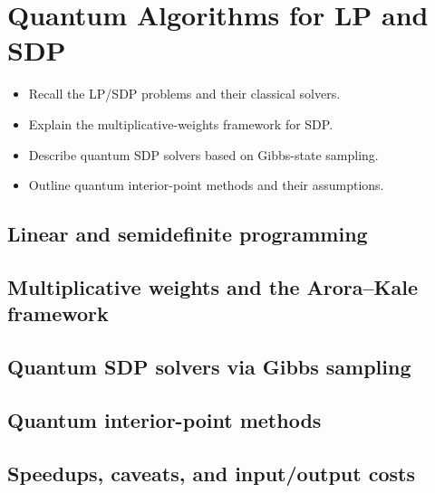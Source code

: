\chapter{Quantum Algorithms for LP and SDP}
\label{ch:lec19}

\begin{objectives}
\begin{itemize}[leftmargin=1.4em,nosep]
  \item Recall the LP/SDP problems and their classical solvers.
  \item Explain the multiplicative-weights framework for SDP.
  \item Describe quantum SDP solvers based on Gibbs-state sampling.
  \item Outline quantum interior-point methods and their assumptions.
\end{itemize}
\end{objectives}


\section{Linear and semidefinite programming}
\label{sec:lec19-1}

\section{Multiplicative weights and the Arora--Kale framework}
\label{sec:lec19-2}

\section{Quantum SDP solvers via Gibbs sampling}
\label{sec:lec19-3}

\section{Quantum interior-point methods}
\label{sec:lec19-4}

\section{Speedups, caveats, and input/output costs}
\label{sec:lec19-5}

\exercisesection
\begin{exercise}
\end{exercise}
\begin{exercise}
\end{exercise}
\begin{exercise}
\end{exercise}

